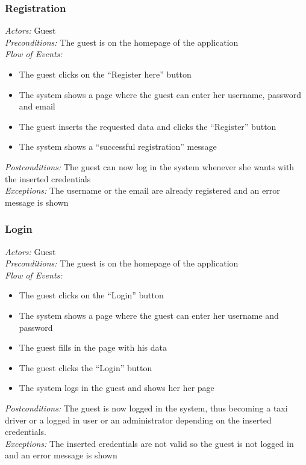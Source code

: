 \documentclass{article}
\begin{document}
\subsubsection{Registration}
\textit{Actors:} Guest
\\\textit{Preconditions:} The guest is on the homepage of the application
\\\textit{Flow of Events:}
\begin{itemize}
	\item  The guest clicks on the ``Register here'' button
	\item  The system shows a page where the guest can enter her username, password and email
	\item  The guest inserts the requested data and clicks the ``Register'' button
	\item  The system shows a ``successful registration'' message 
\end{itemize}
\textit{Postconditions:} The guest can now log in the system whenever she wants with the inserted credentials
\\\textit{Exceptions:} The username or the email are already registered and an error message is shown

\subsubsection{Login}
\textit{Actors:} Guest
\\\textit{Preconditions:} The guest is on the homepage of the application
\\\textit{Flow of Events:}
\begin{itemize}
	\item  The guest clicks on the ``Login'' button
	\item  The system shows a page where the guest can enter her username and password
	\item  The guest fills in the page with his data
	\item  The guest clicks the ``Login'' button
	\item  The system logs in the guest and shows her her page
\end{itemize}
\textit{Postconditions:} The guest is now logged in the system, thus becoming a taxi driver or a logged in user or an administrator depending on the inserted credentials.
\\\textit{Exceptions:} The inserted credentials are not valid so the guest is not logged in and an error message is shown
\end{document}
